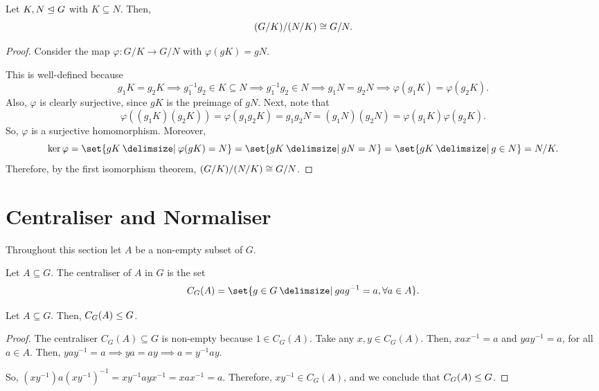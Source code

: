 \documentclass[11pt]{penrose}
\begin{document}
\begin{nthm}
    Let $K, N \mathrel{\trianglelefteq} G$ with $K \subseteq N$. Then,
    \begin{equation*}
        (G/K) / (N/K) \mathrel{\cong} G/N.
    \end{equation*}
\end{nthm}
\begin{proof}
    Consider the map $\varphi : G/K \to G/N$ with $\varphi(gK) = gN$.

    This is well-defined because
    \begin{equation*}
        g_{1}K = g_{2}K
        \implies
        g_{1}^{-1}g_{2} \in K \subseteq N
        \implies
        g_{1}^{-1}g_{2} \in N
        \implies
        g_{1}N = g_{2}N
        \implies
        \varphi(g_{1}K) = \varphi(g_{2}K).
    \end{equation*}
    Also, $\varphi$ is clearly surjective, since $gK$ is the preimage of $gN$. Next, note that
    \begin{equation*}
        \varphi( (g_{1}K)(g_{2}K) )
        = \varphi( g_{1} g_{2} K )
        = g_{1} g_{2} N
        = (g_{1}N) (g_{2}N)
        = \varphi(g_{1}K) \varphi(g_{2}K).
    \end{equation*}
    So, $\varphi$ is a surjective homomorphism. Moreover,
    \begin{equation*}
        \ker\varphi = \set{gK \st \varphi(gK) = N} = \set{gK \st gN = N} = \set{gK \st g \in N} = N/K.
    \end{equation*}
    Therefore, by the first isomorphism theorem, $(G/K) / (N/K) \mathrel{\cong} G/N$.
\end{proof}

\section{Centraliser and Normaliser}

Throughout this section let $A$ be a non-empty subset of $G$.

\begin{ndfn}
    Let $A \subseteq G$. The centraliser of $A$ in $G$ is the set
    \begin{equation*}
        C_{G}(A) = \set{ g \in G \st g a g^{-1} = a, \forall a \in A }.
    \end{equation*}
\end{ndfn}

\begin{nthm}
    Let $A \subseteq G$. Then, $C_{G}(A) \mathrel{\leq} G$.
\end{nthm}
\begin{proof}
    The centraliser $C_{G}(A) \subseteq G$ is non-empty because $1 \in C_{G}(A)$. Take any $x, y \in C_{G}(A)$. Then, $xax^{-1} = a$ and $yay^{-1} = a$, for all $a \in A$. Then, $yay^{-1} = a \implies ya = ay \implies a = y^{-1}ay$.

    So, $(xy^{-1}) a (xy^{-1})^{-1} = x y^{-1} a y x^{-1} = x a x^{-1} = a$. Therefore, $xy^{-1} \in C_{G}(A)$, and we conclude that $C_{G}(A) \mathrel{\leq} G$.
\end{proof}
\end{document}
